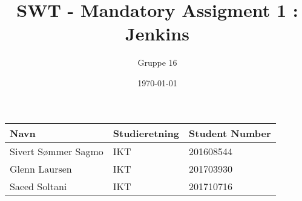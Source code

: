 \documentclass{article}
\title{SWT - Mandatory Assigment 1 : Jenkins}
\author{Gruppe 16}
\date{\today}
\begin{document}
\maketitle

\begin{table}[H]
\centering
\begin{tabular}{|l|l|l|}
\hline
\textbf{Navn}       & \textbf{Studieretning} & \textbf{Student Number} \\ \hline
Sivert Sømmer Sagmo & IKT                    & 201608544             \\ \hline
Glenn Laursen & IKT                    & 201703930             \\ \hline
Saeed Soltani & IKT                    & 201710716             \\ \hline
\end{tabular}
\end{table}

\tableofcontents
\pagebreak










%
%
\end{document}
